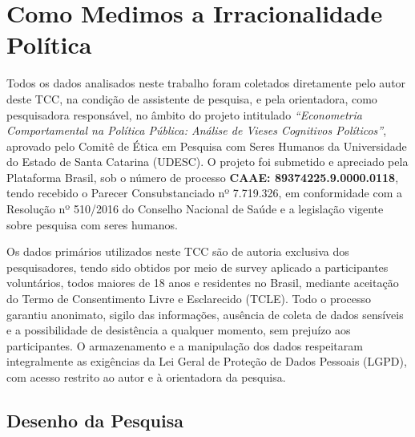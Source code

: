 \chapter{Como Medimos a Irracionalidade Política}
\label{capitulo_3}

Todos os dados analisados neste trabalho foram coletados diretamente pelo autor deste TCC, na condição de assistente de pesquisa, e pela orientadora, como pesquisadora responsável, no âmbito do projeto intitulado \textit{“Econometria Comportamental na Política Pública: Análise de Vieses Cognitivos Políticos”}, aprovado pelo Comitê de Ética em Pesquisa com Seres Humanos da Universidade do Estado de Santa Catarina (UDESC). O projeto foi submetido e apreciado pela Plataforma Brasil, sob o número de processo \textbf{CAAE: 89374225.9.0000.0118}, tendo recebido o Parecer Consubstanciado nº 7.719.326, em conformidade com a Resolução nº 510/2016 do Conselho Nacional de Saúde e a legislação vigente sobre pesquisa com seres humanos.

Os dados primários utilizados neste TCC são de autoria exclusiva dos pesquisadores, tendo sido obtidos por meio de survey aplicado a participantes voluntários, todos maiores de 18 anos e residentes no Brasil, mediante aceitação do Termo de Consentimento Livre e Esclarecido (TCLE). Todo o processo garantiu anonimato, sigilo das informações, ausência de coleta de dados sensíveis e a possibilidade de desistência a qualquer momento, sem prejuízo aos participantes. O armazenamento e a manipulação dos dados respeitaram integralmente as exigências da Lei Geral de Proteção de Dados Pessoais (LGPD), com acesso restrito ao autor e à orientadora da pesquisa.

\section{Desenho da Pesquisa}

